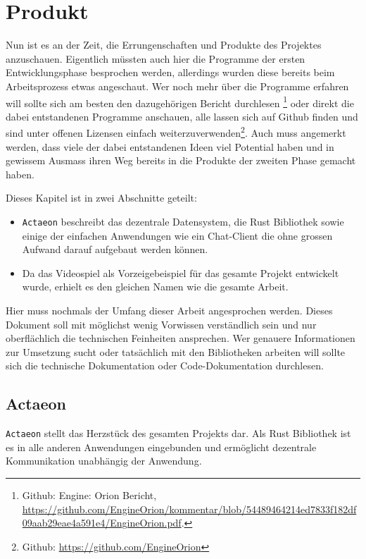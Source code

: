 \documentclass[11pt]{article}
\begin{document}
\section{Produkt}
\label{sec:org73221dc}
Nun ist es an der Zeit, die Errungenschaften und Produkte des
Projektes anzuschauen. Eigentlich müssten auch hier die Programme der
ersten Entwicklungsphase besprochen werden, allerdings wurden diese
bereits beim Arbeitsprozess etwas angeschaut. Wer noch mehr über die
Programme erfahren will sollte sich am besten den dazugehörigen
Bericht durchlesen \footnote{Github: Engine: Orion Bericht,
\url{https://github.com/EngineOrion/kommentar/blob/54489464214ed7833f182df09aab29eae4a591e4/EngineOrion.pdf}.} oder direkt die dabei entstandenen
Programme anschauen, alle lassen sich auf Github finden und sind unter
offenen Lizensen einfach weiterzuverwenden\footnote{Github: \url{https://github.com/EngineOrion}}. Auch muss angemerkt werden, dass viele der dabei
entstandenen Ideen viel Potential haben und in gewissem Ausmass ihren
Weg bereits in die Produkte der zweiten Phase gemacht haben.

\noindent Dieses Kapitel ist in zwei Abschnitte geteilt:
\begin{itemize}
\item \texttt{Actaeon} beschreibt das dezentrale Datensystem, die Rust Bibliothek
sowie einige der einfachen Anwendungen wie ein Chat-Client die ohne
grossen Aufwand darauf aufgebaut werden können.
\item Da das Videospiel als Vorzeigebeispiel für das gesamte Projekt
entwickelt wurde, erhielt es den gleichen Namen wie die gesamte
Arbeit.
\end{itemize}

\noindent Hier muss nochmals der Umfang dieser Arbeit angesprochen
werden. Dieses Dokument soll mit möglichst wenig Vorwissen
verständlich sein und nur oberflächlich die technischen Feinheiten
ansprechen. Wer genauere Informationen zur Umsetzung sucht oder
tatsächlich mit den Bibliotheken arbeiten will sollte sich die
technische Dokumentation oder Code-Dokumentation durchlesen.
\subsection{Actaeon}
\label{sec:org49acaba}
\texttt{Actaeon} stellt das Herzstück des gesamten Projekts dar. Als Rust
Bibliothek ist es in alle anderen Anwendungen eingebunden und
ermöglicht dezentrale Kommunikation unabhängig der Anwendung.\\
\end{document}
